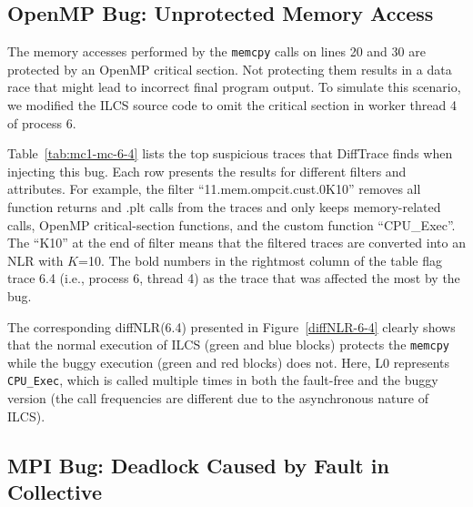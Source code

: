 \subsection{OpenMP Bug: Unprotected Memory Access}

The memory accesses performed by the \texttt{memcpy} calls on lines 20 and 30 are protected by an OpenMP critical section.
%
Not protecting them results in a data race that might lead to incorrect final program output.
%
To simulate this scenario, we modified the ILCS source code to omit the critical section in worker thread 4 of process 6.

Table~\ref{tab:mc1-mc-6-4} lists the top suspicious traces that DiffTrace finds when injecting this bug.
%
Each row presents the results for different filters and attributes.
%
For example, the filter ``11.mem.ompcit.cust.0K10'' removes all function returns and .plt calls from the traces and only keeps memory-related calls, OpenMP critical-section functions, and the custom function ``CPU\_Exec''.
%
The ``K10'' at the end of filter means that the filtered traces are converted into an NLR with $K$=10.
%
%
The bold numbers in the rightmost column of the table flag trace 6.4 (i.e., process 6, thread 4) as the trace that was affected the most by the bug.
%

The corresponding diffNLR(6.4) presented in Figure~\ref{diffNLR-6-4} clearly shows that the normal execution of ILCS (green and blue blocks) protects the \texttt{memcpy} while the buggy execution (green and red blocks) does not. Here, L0 represents \texttt{CPU\_Exec}, which is called multiple times in both the fault-free and the buggy version (the call frequencies are different due to the asynchronous nature of ILCS).
%





\subsection{MPI Bug: Deadlock Caused by Fault in Collective}

